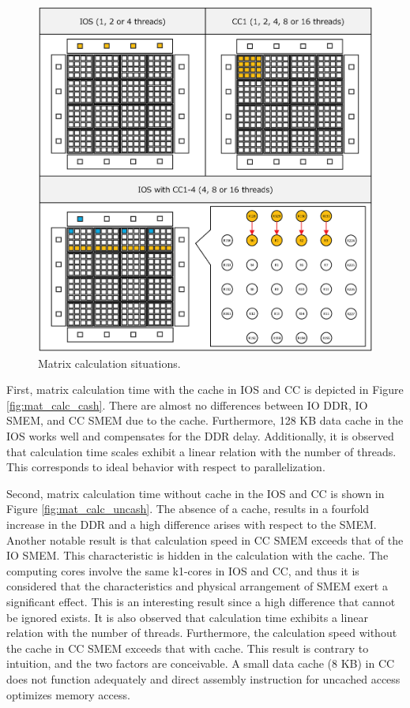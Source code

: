 \documentclass{sig-alternate-05-2015}
\begin{document}
\begin{figure}[t]
  \centering
  \includegraphics[width=1.0\linewidth]{../figure/matrix_calculation.eps}
  \caption{\label{fig:mat_calc}
    Matrix calculation situations.}
\end{figure}

First, matrix calculation time with the cache in IOS and CC is depicted in Figure \ref{fig:mat_calc_cash}.
There are almost no differences between IO DDR, IO SMEM, and CC SMEM due to the cache.
Furthermore, 128 KB data cache in the IOS works well and compensates for the DDR delay.
Additionally, it is observed that calculation time scales exhibit a linear relation with the number of threads.
This corresponds to ideal behavior with respect to parallelization.

Second, matrix calculation time without cache in the IOS and CC is shown in Figure \ref{fig:mat_calc_uncash}.
The absence of a cache, results in a fourfold increase in the DDR and a high difference arises with respect to the SMEM.
Another notable result is that calculation speed in CC SMEM exceeds that of the IO SMEM.
This characteristic is hidden in the calculation with the cache.
The computing cores involve the same k1-cores in IOS and CC, and thus it is considered that the characteristics and physical arrangement of SMEM exert a significant effect.
This is an interesting result since a high difference that cannot be ignored exists.
It is also observed that calculation time exhibits a linear relation with the number of threads.
Furthermore, the calculation speed without the cache in CC SMEM exceeds that with cache.
This result is contrary to intuition, and the two factors are conceivable.
A small data cache (8 KB) in CC does not function adequately and direct assembly instruction for uncached access optimizes memory access.
\end{document}
